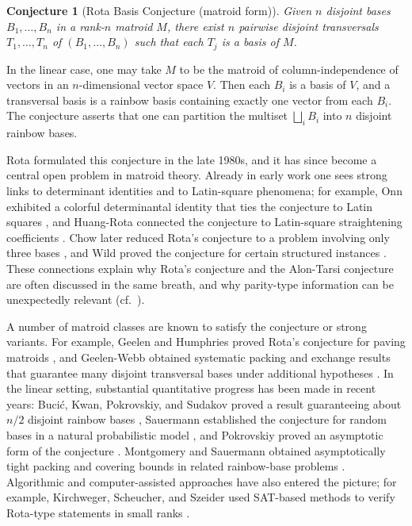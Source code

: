 \documentclass[11pt]{amsart}
\newtheorem{conjecture}{Conjecture}
\begin{document}
\begin{conjecture}[Rota Basis Conjecture (matroid form)]
\label{conj:RBC}
Given $n$ disjoint bases $B_1,\dots,B_n$ in a rank-$n$ matroid $M$, there exist $n$ pairwise disjoint transversals $T_1,\dots,T_n$ of $(B_1,\dots,B_n)$ such that each $T_j$ is a basis of $M$.
\end{conjecture}

In the linear case, one may take $M$ to be the matroid of column-independence of vectors in an $n$-dimensional vector space $V$.
Then each $B_i$ is a basis of $V$, and a transversal basis is a rainbow basis containing exactly one vector from each $B_i$.
The conjecture asserts that one can partition the multiset $\bigsqcup_i B_i$ into $n$ disjoint rainbow bases.

Rota formulated this conjecture in the late 1980s, and it has since become a central open problem in matroid theory.
Already in early work one sees strong links to determinant identities and to Latin-square phenomena; for example, Onn exhibited a colorful determinantal identity that ties the conjecture to Latin squares \cite{Onn1997}, and Huang-Rota connected the conjecture to Latin-square straightening coefficients \cite{HuangRota1994}.
Chow later reduced Rota's conjecture to a problem involving only three bases \cite{Chow2009}, and Wild proved the conjecture for certain structured instances \cite{Wild1994}.
These connections explain why Rota's conjecture and the Alon-Tarsi conjecture are often discussed in the same breath, and why parity-type information can be unexpectedly relevant (cf.\ \cite{Gly10}).

A number of matroid classes are known to satisfy the conjecture or strong variants.
For example, Geelen and Humphries proved Rota's conjecture for paving matroids \cite{GeelenHumphries2006}, and Geelen-Webb obtained systematic packing and exchange results that guarantee many disjoint transversal bases under additional hypotheses \cite{GeelenWebb2007}.
In the linear setting, substantial quantitative progress has been made in recent years: Buci\'c, Kwan, Pokrovskiy, and Sudakov proved a result guaranteeing about $n/2$ disjoint rainbow bases \cite{BucicKwanPokrovskiySudakov2020}, Sauermann established the conjecture for random bases in a natural probabilistic model \cite{Sauermann2024}, and Pokrovskiy proved an asymptotic form of the conjecture \cite{Pokrovskiy2025}.
Montgomery and Sauermann obtained asymptotically tight packing and covering bounds in related rainbow-base problems \cite{MontgomerySauermann2025}.
Algorithmic and computer-assisted approaches have also entered the picture; for example, Kirchweger, Scheucher, and Szeider used SAT-based methods to verify Rota-type statements in small ranks \cite{KirchwegerScheucherSzeider2022}.
\end{document}
